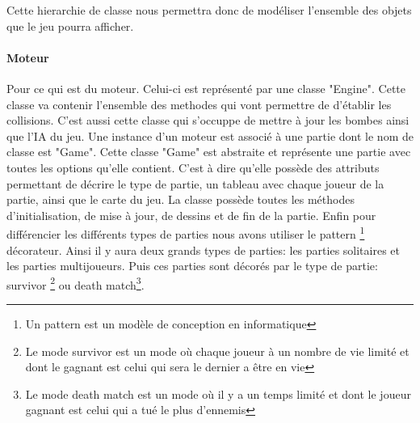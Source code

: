 	Cette hierarchie de classe nous permettra donc de modéliser l'ensemble des objets que le jeu pourra afficher.
	
	
	
	\paragraph{Moteur\\}
	
	Pour ce qui est du moteur. Celui-ci est représenté par une classe "Engine". Cette classe va contenir l'ensemble des methodes qui vont permettre de d'établir les collisions. C'est aussi cette classe qui s'occuppe de mettre à jour les bombes ainsi que l'IA du jeu. 
	Une instance d'un moteur est associé à une partie dont le nom de classe est "Game". Cette classe "Game" est abstraite et représente une partie avec toutes les options qu'elle contient. C'est à dire qu'elle possède des attributs permettant de décrire le type de partie, un tableau avec chaque joueur de la partie, ainsi que le carte du jeu. La classe possède toutes les méthodes d'initialisation, de mise à jour, de dessins et de fin de la partie. Enfin pour différencier les différents types de parties nous avons utiliser le pattern \footnote{Un pattern est un modèle de conception en informatique} décorateur. Ainsi il y aura deux grands types de parties: les parties solitaires et les parties multijoueurs. Puis ces parties sont décorés par le type de partie: survivor \footnote{Le mode survivor est un mode où chaque joueur à un nombre de vie limité et dont le gagnant est celui qui sera le dernier a être en vie} ou death match\footnote{Le mode death match est un mode où il y a un temps limité et dont le joueur gagnant est celui qui a tué le plus d'ennemis}.
	
